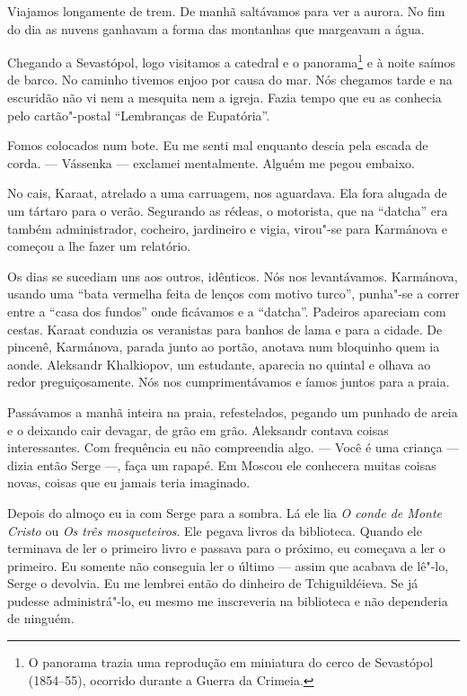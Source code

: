Viajamos longamente de trem. De manhã saltávamos para ver a aurora. No
fim do dia as nuvens ganhavam a forma das montanhas que margeavam a
água.

Chegando a Sevastópol, logo visitamos a catedral e o panorama\footnote{O
  panorama trazia uma reprodução em miniatura do cerco de Sevastópol
  (1854--55), ocorrido durante a Guerra da Crimeia.} e à noite saímos de
barco. No caminho tivemos enjoo por causa do mar. Nós chegamos tarde e
na escuridão não vi nem a mesquita nem a igreja. Fazia tempo que eu as
conhecia pelo cartão"-postal ``Lembranças de Eupatória''.

Fomos colocados num bote. Eu me senti mal enquanto descia pela escada de
corda. --- Vássenka --- exclamei mentalmente. Alguém me pegou embaixo.

No cais, Karaat, atrelado a uma carruagem, nos aguardava. Ela fora
alugada de um tártaro para o verão. Segurando as rédeas, o motorista,
que na ``datcha'' era também administrador, cocheiro, jardineiro e
vigia, virou"-se para Karmánova e começou a lhe fazer um relatório.

Os dias se sucediam uns aos outros, idênticos. Nós nos levantávamos.
Karmánova, usando uma ``bata vermelha feita de lenços com motivo
turco'', punha"-se a correr entre a ``casa dos fundos'' onde ficávamos e
a ``datcha''. Padeiros apareciam com cestas. Karaat conduzia os
veranistas para banhos de lama e para a cidade. De pincenê, Karmánova,
parada junto ao portão, anotava num bloquinho quem ia aonde. Aleksandr
Khalkiopov, um estudante, aparecia no quintal e olhava ao redor
preguiçosamente. Nós nos cumprimentávamos e íamos juntos para a praia.

Passávamos a manhã inteira na praia, refestelados, pegando um punhado de
areia e o deixando cair devagar, de grão em grão. Aleksandr contava
coisas interessantes. Com frequência eu não compreendia algo. --- Você é
uma criança --- dizia então Serge ---, faça um rapapé. Em Moscou ele
conhecera muitas coisas novas, coisas que eu jamais teria imaginado.

Depois do almoço eu ia com Serge para a sombra. Lá ele lia \emph{O conde
de Monte Cristo} ou \emph{Os três mosqueteiros}. Ele pegava livros da
biblioteca. Quando ele terminava de ler o primeiro livro e passava para
o próximo, eu começava a ler o primeiro. Eu somente não conseguia ler o
último --- assim que acabava de lê"-lo, Serge o devolvia. Eu me lembrei
então do dinheiro de Tchiguildéieva. Se já pudesse administrá"-lo, eu
mesmo me inscreveria na biblioteca e não dependeria de ninguém.

